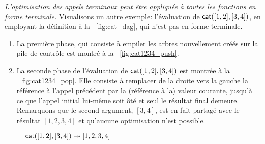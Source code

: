 \emph{L'optimisation des appels terminaux peut être appliquée à toutes
  les fonctions en forme terminale.} Visualisons un autre exemple:
l'évaluation de \(\textsf{cat}([1,2],[3,4])\), en employant la définition
à la \fig~\vref{fig:cat_dag}, qui n'est pas en forme terminale.
\begin{enumerate}

  \item La première phase, qui consiste à empiler les arbres
  nouvellement créés sur la pile de contrôle est montré à la
  \fig~\vref{fig:cat1234_push}.

  \item La seconde phase de l'évaluation de \(\textsf{cat}([1,2],[3,4])\)
  est montrée à la \fig~\vref{fig:cat1234_pop}. Elle consiste à
  remplacer de la droite vers la gauche la référence à l'appel
  précédent par la (référence à la) valeur courante, jusqu'à ce que
  l'appel initial lui-même soit ôté et seul le résultat final
  demeure. Remarquons que le second argument, \([3,4]\), est en fait
  partagé avec le résultat \([1,2,3,4]\) et qu'aucune optimisation
  n'est possible.

\end{enumerate}
\begin{figure}[!t]
\centering
{}
\vskip32pt
{}
\caption{\(\textsf{cat}([1,2],[3,4]) \twoheadrightarrow [1,2,3,4]\)} %
\end{figure}


\label{sec:into_tail_form}

